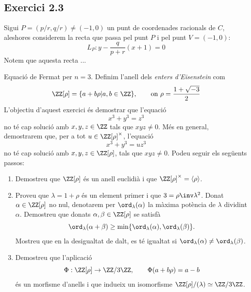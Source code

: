 \documentclass[11pt, a4paper]{article}
\begin{document}
    \subsection{Exercici 2.3}
    Sigui $P=(p/r,q/r)\neq (-1,0)$ un punt de coordenades racionals de $C$, aleshores considerem la recta que passa pel punt $P$ i pel punt $V=(-1,0)$:
    \[
        L_P:y-\frac{q}{p+r}(x+1)=0
    \]
    Notem que aquesta recta ...
    \newpage
    \begin{tcolorbox}[title=\section{FP 1 Exercici 3}]
        Equació de Fermat per $n=3$. Definim l'anell dels \textit{enters d'Eisenstein} com
        \[
            \ZZ[\rho]=\{a+b\rho|a,b\in\ZZ\},\qquad\text{on }\rho=\frac{1+\sqrt{-3}}{2}
        \]
        L'objectiu d'aquest exercici és demostrar que l'equació
        \[
        x^3+y^3=z^3
        \]
        no té cap solució amb $x,y,z\in\ZZ$ tals que $xyz\neq0$. Més en general, demostrarem que, per a tot $u\in\ZZ[\rho]^\times$, l'equació
        \begin{equation}\label{FP1P3 equació de Fermat}
            x^3+y^3=uz^3
        \end{equation}
        no té cap solució amb $x,y,z\in \ZZ[\rho]$, tals que $xyz\neq0$. Podeu seguir els següents passos:
        \begin{enumerate}
            \item Demostreu que $\ZZ[\rho]$ és un anell euclidià i que $\ZZ[\rho]^\times=\langle \rho\rangle$.
            \item Proveu que $\lambda=1+\rho$ és un element primer i que $3=\rho\inv\lambda^2$. Donat $\alpha\in\ZZ[\rho]$ no nul, denotarem per $\ord_\lambda(\alpha)$ la màxima potència de $\lambda$ dividint $\alpha$. Demostreu que donats $\alpha,\beta\in\ZZ[\rho]$ se satisfà
            \[
                \ord_\lambda(\alpha+\beta)\geq\min\{\ord_\lambda(\alpha),\ord_\lambda(\beta)\}.
            \]
            Mostreu que en la desigualtat de dalt, es té igualtat si $\ord_\lambda(\alpha)\neq\ord_\lambda(\beta)$.
            \item Demostreu que l'aplicació
            \[
                \Phi:\ZZ[\rho]\to\ZZ/3\ZZ,\qquad \Phi(a+b\rho)=a-b
            \]
            és un morfisme d'anells i que indueix un isomorfisme $\ZZ[\rho]/(\lambda)\simeq\ZZ/3\ZZ$.

\end{enumerate}
\end{tcolorbox}
\end{document}
